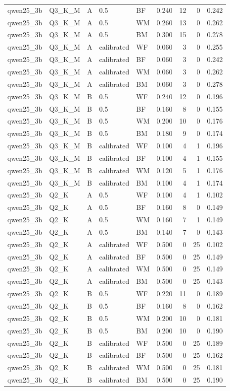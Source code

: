\begin{tabular}{lllllrrrr}
qwen25\_3b & Q3\_K\_M & A & 0.5 & BF & 0.240 & 12 & 0 & 0.242 \\
qwen25\_3b & Q3\_K\_M & A & 0.5 & WM & 0.260 & 13 & 0 & 0.262 \\
qwen25\_3b & Q3\_K\_M & A & 0.5 & BM & 0.300 & 15 & 0 & 0.278 \\
qwen25\_3b & Q3\_K\_M & A & calibrated & WF & 0.060 & 3 & 0 & 0.255 \\
qwen25\_3b & Q3\_K\_M & A & calibrated & BF & 0.060 & 3 & 0 & 0.242 \\
qwen25\_3b & Q3\_K\_M & A & calibrated & WM & 0.060 & 3 & 0 & 0.262 \\
qwen25\_3b & Q3\_K\_M & A & calibrated & BM & 0.060 & 3 & 0 & 0.278 \\
qwen25\_3b & Q3\_K\_M & B & 0.5 & WF & 0.240 & 12 & 0 & 0.196 \\
qwen25\_3b & Q3\_K\_M & B & 0.5 & BF & 0.160 & 8 & 0 & 0.155 \\
qwen25\_3b & Q3\_K\_M & B & 0.5 & WM & 0.200 & 10 & 0 & 0.176 \\
qwen25\_3b & Q3\_K\_M & B & 0.5 & BM & 0.180 & 9 & 0 & 0.174 \\
qwen25\_3b & Q3\_K\_M & B & calibrated & WF & 0.100 & 4 & 1 & 0.196 \\
qwen25\_3b & Q3\_K\_M & B & calibrated & BF & 0.100 & 4 & 1 & 0.155 \\
qwen25\_3b & Q3\_K\_M & B & calibrated & WM & 0.120 & 5 & 1 & 0.176 \\
qwen25\_3b & Q3\_K\_M & B & calibrated & BM & 0.100 & 4 & 1 & 0.174 \\
qwen25\_3b & Q2\_K & A & 0.5 & WF & 0.100 & 4 & 1 & 0.102 \\
qwen25\_3b & Q2\_K & A & 0.5 & BF & 0.160 & 8 & 0 & 0.149 \\
qwen25\_3b & Q2\_K & A & 0.5 & WM & 0.160 & 7 & 1 & 0.149 \\
qwen25\_3b & Q2\_K & A & 0.5 & BM & 0.140 & 7 & 0 & 0.143 \\
qwen25\_3b & Q2\_K & A & calibrated & WF & 0.500 & 0 & 25 & 0.102 \\
qwen25\_3b & Q2\_K & A & calibrated & BF & 0.500 & 0 & 25 & 0.149 \\
qwen25\_3b & Q2\_K & A & calibrated & WM & 0.500 & 0 & 25 & 0.149 \\
qwen25\_3b & Q2\_K & A & calibrated & BM & 0.500 & 0 & 25 & 0.143 \\
qwen25\_3b & Q2\_K & B & 0.5 & WF & 0.220 & 11 & 0 & 0.189 \\
qwen25\_3b & Q2\_K & B & 0.5 & BF & 0.160 & 8 & 0 & 0.162 \\
qwen25\_3b & Q2\_K & B & 0.5 & WM & 0.200 & 10 & 0 & 0.181 \\
qwen25\_3b & Q2\_K & B & 0.5 & BM & 0.200 & 10 & 0 & 0.190 \\
qwen25\_3b & Q2\_K & B & calibrated & WF & 0.500 & 0 & 25 & 0.189 \\
qwen25\_3b & Q2\_K & B & calibrated & BF & 0.500 & 0 & 25 & 0.162 \\
qwen25\_3b & Q2\_K & B & calibrated & WM & 0.500 & 0 & 25 & 0.181 \\
qwen25\_3b & Q2\_K & B & calibrated & BM & 0.500 & 0 & 25 & 0.190 \\
\bottomrule
\end{tabular}

